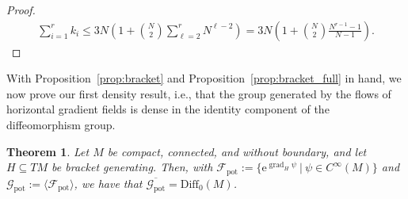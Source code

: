 \documentclass{article}
\newtheorem{theorem}{Theorem}
\theoremstyle{remark}
\newcommand{\M}{M}
\newcommand{\Cinf}{C^{\infty}(\M)}
\newcommand{\Diff}{\mathrm{Diff}_0(\M)}
\DeclareMathOperator{\grad}{\mathrm{grad}}
\newcommand{\GPOT}{\mathcal{G}_{\mathrm{pot}}}
\newcommand{\FPOT}{\mathcal{F}_{\mathrm{pot}}}
\begin{document}
\begin{proof}
    \begin{align*}
        \sum_{i=1}^r k_{i} \leq 3N \left(1+\binom{N}{2}\sum_{\ell=2}^{r} N^{\ell-2}\right) = 3N \left(1+\binom{N}{2}\frac{N^{r-1}-1}{N-1}\right).
    \end{align*}
\end{proof}
%

%
With Proposition~\ref{prop:bracket} and Proposition~\ref{prop:bracket_full} in hand, we now prove our first density result, i.e., that the group generated by the flows of horizontal gradient fields is dense in the identity component of the diffeomorphism group. 
%

%
\begin{theorem}\label{thm:POT_Diff}
    Let $\M$ be compact, connected, and without boundary, and let $H\subseteq T\M$ be bracket generating. Then, with $\FPOT:=\{\mathrm{e}^{\grad_H \psi}~|~\psi\in\Cinf\}$ and $\GPOT:=\langle\FPOT\rangle$, we have that $\overline{\GPOT} = \Diff$.
\end{theorem}
\end{document}
